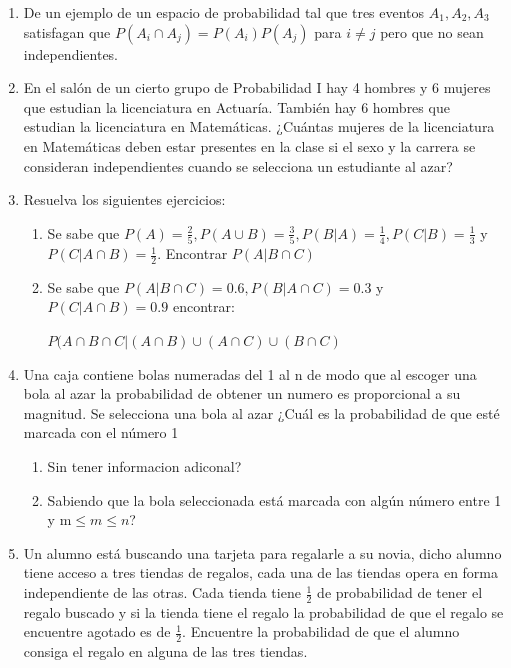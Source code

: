 \documentclass[12pt,a4paper]{report}
\begin{document}
\begin{enumerate}
   \item {
   De un ejemplo de un espacio de probabilidad tal que tres eventos $A_{1},A_{2},A_{3}$ satisfagan que $P(A_{i}\cap A_{j})=P(A_{i})P(A_{j})$ para $i\neq j$ pero que no sean independientes.\\
	}

   \item {En el salón de un cierto grupo de Probabilidad I hay 4 hombres y 6 mujeres que estudian la licenciatura en Actuaría. También hay 6 hombres que estudian la licenciatura en Matemáticas. ¿Cuántas mujeres de la licenciatura en Matemáticas deben estar presentes en la clase si el sexo y la carrera se consideran independientes cuando se selecciona un estudiante al azar?
	}

  \item{
 Resuelva los siguientes ejercicios:\\
 \begin{enumerate}[label=\alph*) ]
 \item{Se sabe que $P(A)= \frac{2}{5},P(A\cup B)=\frac{3}{5},P(B|A)=\frac{1}{4},P(C|B)=\frac{1}{3}$ y $P(C|A\cap B)=\frac{1}{2}$. Encontrar $P(A|B\cap C)$}\\
 \item{Se sabe que $P(A|B\cap C)=0.6, P(B|A\cap C)=0.3$ y $P(C|A\cap B)=0.9$ encontrar: \\
 \begin{center}
 $P(A\cap B\cap C| (A\cap B) \cup (A\cap C) \cup (B\cap C)$
 \end{center} }
 \end{enumerate}
  }


  \item{
 Una caja contiene bolas numeradas del 1 al n de modo que al escoger una bola al azar la probabilidad de obtener un numero es proporcional a su magnitud. Se selecciona una bola al azar ¿Cuál es la probabilidad de que esté marcada con el número 1\\
 \begin{enumerate}[label= \alph*) ]
 \item{Sin tener informacion adiconal?}\\
 \item{Sabiendo que la bola seleccionada está marcada con algún número entre 1 y m$\leq m \leq n$?}
 \end{enumerate}
  }

  \item{
Un alumno está buscando una tarjeta para regalarle a su novia, dicho alumno tiene acceso a tres tiendas de regalos, cada una de las tiendas opera en forma independiente de las otras. Cada tienda tiene $\frac{1}{2}$ de probabilidad de tener el regalo buscado y si la tienda tiene el regalo la probabilidad de que el regalo se encuentre agotado es de $\frac{1}{2}$. Encuentre la probabilidad de que el alumno consiga el regalo en alguna de las tres tiendas.
  }






\end{enumerate}
\end{document}
